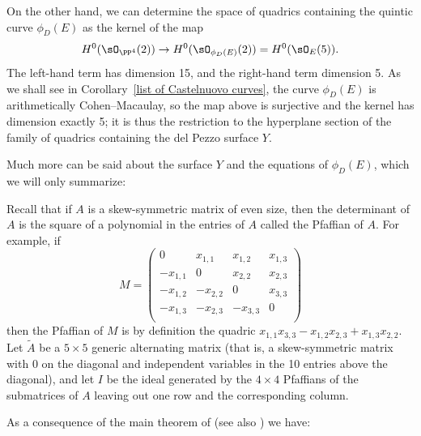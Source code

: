 On the other hand, we can determine the space of quadrics containing the quintic curve $\phi_D(E)$ as the kernel of the map
$$
H^0(\sO_{\PP^4}(2)) \to H^0(\sO_{\phi_D(E)}(2)) = H^0(\sO_{E}(5)).
$$
The left-hand term has dimension 15, and the right-hand term dimension
5. As we shall see in Corollary~\ref{list of Castelnuovo curves}, the curve
$\phi_D(E)$ is arithmetically Cohen--Macaulay, so the map above is surjective and the kernel has dimension exactly 5; it is
thus the restriction to the hyperplane section of the family of quadrics 
containing the del Pezzo surface $Y$.

Much more can be said about the surface $Y$ and the equations of $\phi_D(E)$, which we will only summarize:

\begin{fact}
Recall that if $A$ is a skew-symmetric matrix of even size,
then the determinant of $A$ is the square of a polynomial in the entries of $A$ called the Pfaffian of $A$. For example, if
%
$$
M = \begin{pmatrix}
0&x_{1,1}&x_{1,2}&x_{1,3}\\
-x_{1,1}&0&x_{2,2}&x_{2,3}\\
-x_{1,2}&-x_{2,2}&0&x_{3,3}\\
-x_{1,3}&-x_{2,3}&-x_{3,3}&0\\
\end{pmatrix}
$$
then the Pfaffian of $M$ is by definition the quadric $x_{1,1}x_{3,3}-x_{1,2}x_{2,3}+x_{1,3}x_{2,2}$.
Let $\tilde A$ be a $5\times 5$ generic alternating matrix (that is, a skew-symmetric matrix with 0 on the diagonal and independent variables
in the 10 entries above the diagonal), and let $I$ be the ideal
generated by the $4\times 4$ Pfaffians of
the submatrices of $A$ leaving out one row and the corresponding column.

\hskip-1pt As a consequence of the main theorem of  \cite{MR453723} 
(see also \cite[Theorem 11]{Eisenbud1995}) we have:


\end{fact}
